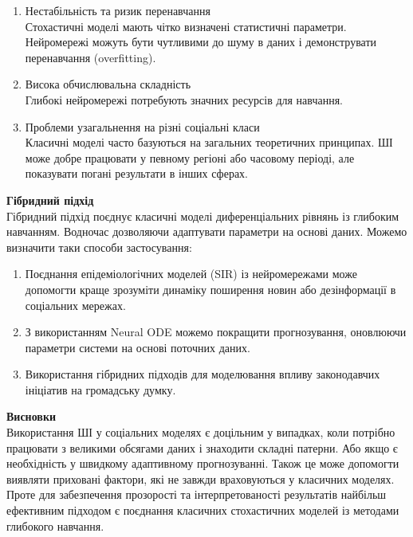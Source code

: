 \documentclass[a4paper,12pt]{article}
\begin{document}
\begin{enumerate}
\begin{enumerate}
            \item Нестабільність та ризик перенавчання \\
            Стохастичні моделі мають чітко визначені статистичні параметри.
            Нейромережі можуть бути чутливими до шуму в даних і демонструвати перенавчання (overfitting).
        
            \item Висока обчислювальна складність \\
            Глибокі нейромережі потребують значних ресурсів для навчання.
        
            \item Проблеми узагальнення на різні соціальні класи \\
            Класичні моделі часто базуються на загальних теоретичних принципах.
            ШІ може добре працювати у певному регіоні або часовому періоді, але показувати погані результати в інших сферах.
        \end{enumerate}
    \end{enumerate}
    \textbf{Гібридний підхід} \\
    Гібридний підхід поєднує класичні моделі диференціальних рівнянь із глибоким навчанням. 
    Водночас дозволяючи адаптувати параметри на основі даних.
    Можемо визначити таки способи застосування:
    \begin{enumerate}
        \item Поєднання епідеміологічних моделей (SIR) із нейромережами може допомогти краще зрозуміти динаміку поширення новин або дезінформації в соціальних мережах.
        \item З використанням Neural ODE можемо покращити прогнозування, оновлюючи параметри системи на основі поточних даних.
        \item Використання гібридних підходів для моделювання впливу законодавчих ініціатив на громадську думку.
    \end{enumerate}
    \textbf{Висновки} \\
    Використання ШІ у соціальних моделях є доцільним у випадках, коли потрібно працювати з великими обсягами даних і 
    знаходити складні патерни. Або якщо є необхідність у швидкому адаптивному прогнозуванні.
    Також це може допомогти виявляти приховані фактори, які не завжди враховуються у класичних моделях. \\ 
    Проте для забезпечення прозорості та інтерпретованості результатів найбільш ефективним підходом є поєднання класичних стохастичних моделей із методами глибокого навчання.
\end{document}

